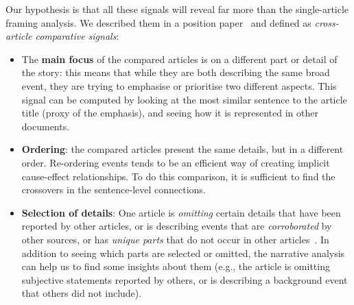 Our hypothesis is that all these signals will reveal far more than the single-article framing analysis.
We described them in a position paper~\cite{mensio2020towards} and defined as \emph{cross-article comparative signals}:

\begin{itemize}
    \item The \textbf{main focus} of the compared articles is on a different part or detail of the story: this means that while they are both describing the same broad event, they are trying to emphasise or prioritise two different aspects.
    This signal can be computed by looking at the most similar sentence to the article title (proxy of the emphasis), and seeing how it is represented in other documents.
    
    \item \textbf{Ordering}: the compared articles present the same details, but in a different order.
    Re-ordering events tends to be an efficient way of creating implicit cause-effect relationships. 
    To do this comparison, it is sufficient to find the crossovers in the sentence-level connections.

    \item \textbf{Selection of details}:
    One article is \emph{omitting} certain details that have been reported by other articles, or is describing events that are \emph{corroborated} by other sources, or has \emph{unique parts} that do not occur in other articles~\cite{bountouridis2018explaining}.
    In addition to seeing which parts are selected or omitted, the narrative analysis can help us to find some insights about them (e.g., the article is omitting subjective statements reported by others, or is describing a background event that others did not include).
    

\end{itemize}

